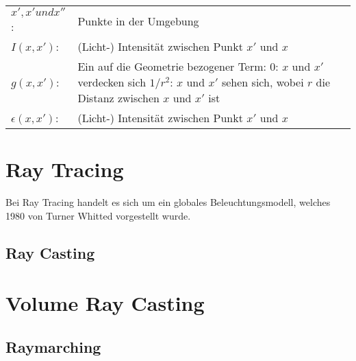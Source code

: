 \begin{tabular}{ l l }
    $ x', x' und x''  $: & Punkte in der Umgebung                                                                                               \\
    $ I(x, x')        $: & (Licht-) Intensität zwischen Punkt $x'$ und $x$                                                                      \\
    $ g(x, x')        $: & \parbox[t]{14cm}{Ein auf die Geometrie bezogener Term:                                                               \\
                                \hspace*{12mm} $0$:     \hspace*{6mm} $x$ und $x'$ verdecken sich                                               \\
                                \hspace*{12mm} $1/r^2$: \hspace*{1mm} $x$ und $x'$ sehen sich, wobei $r$ die Distanz zwischen $x$ und $x'$ ist} \\
    $ \epsilon(x, x') $: & (Licht-) Intensität zwischen Punkt $x'$ und $x$                                                                      \\
\end{tabular}

\section{Ray Tracing}
\label{sec:ray_tracing}

Bei Ray Tracing handelt es sich um ein globales Beleuchtungsmodell, welches 1980 von Turner Whitted vorgestellt wurde.

\subsection{Ray Casting}
\label{subsec:ray_casting}


\section{Volume Ray Casting}
\label{sec:volume_ray_casting}


\subsection{Raymarching}
\label{subsec:raymarching}

